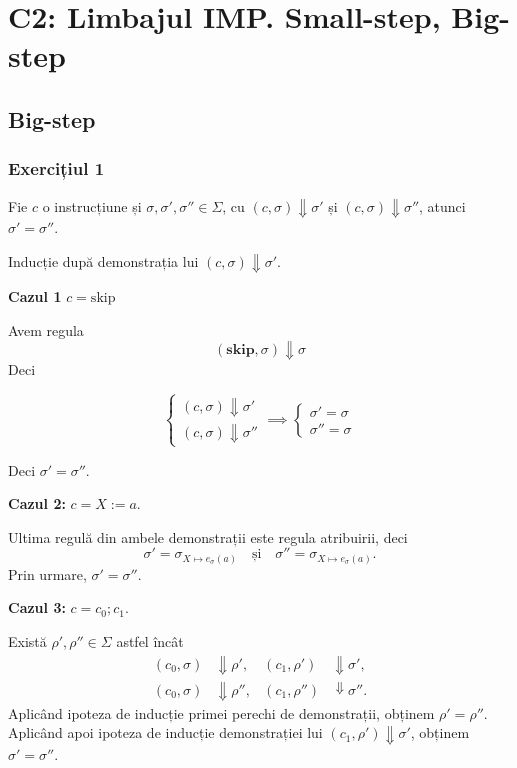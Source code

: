 \section*{C2: Limbajul IMP. Small-step, Big-step}

\subsection{Big-step}

\subsubsection{Exercițiul 1}

Fie $c$ o instrucțiune și $\sigma, \sigma', \sigma'' \in \Sigma$, cu $(c, \sigma) \Downarrow \sigma'$ și $(c, \sigma) \Downarrow \sigma''$, atunci $\sigma' = \sigma''$.


Inducție după demonstrația lui $(c, \sigma) \Downarrow \sigma'$.

\textbf{Cazul 1}
$c = \mathbf{\mathrm{skip}}$

Avem regula
\[
	(\mathrm{\mathbf{skip}}, \sigma) \Downarrow \sigma
\]
Deci

\[
	\begin{cases}
		(c, \sigma) \Downarrow \sigma' \\
		(c, \sigma) \Downarrow \sigma''
	\end{cases}
	\implies
	\begin{cases}
		\sigma' = \sigma \\
		\sigma'' = \sigma
	\end{cases}
\]

Deci $\sigma' = \sigma''$.

\textbf{Cazul 2:} $c = X := a$.

Ultima regulă din ambele demonstrații este regula atribuirii, deci
\[
	\sigma' = \sigma_{X \mapsto e_\sigma(a)}
	\quad\text{și}\quad
	\sigma'' = \sigma_{X \mapsto e_\sigma(a)}.
\]
Prin urmare, $\sigma' = \sigma''$.

\textbf{Cazul 3:} $c = c_0;c_1$.

Există $\rho',\rho'' \in \Sigma$ astfel încât
\[
	\begin{aligned}
		(c_0,\sigma) & \Downarrow\rho',
		             & (c_1,\rho')       & \Downarrow\sigma',  \\
		(c_0,\sigma) & \Downarrow\rho'',
		             & (c_1,\rho'')      & \Downarrow\sigma''.
	\end{aligned}
\]
Aplicând ipoteza de inducție primei perechi de demonstrații, obținem
$\rho'=\rho''$. Aplicând apoi ipoteza de inducție demonstrației lui
$(c_1,\rho')\Downarrow\sigma'$, obținem $\sigma'=\sigma''$.


